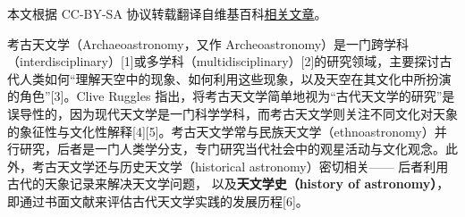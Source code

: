 
本文根据 CC-BY-SA 协议转载翻译自维基百科\href{https://en.wikipedia.org/wiki/Archaeoastronomy}{相关文章}。


考古天文学（Archaeoastronomy，又作 Archeoastronomy）是一门跨学科（interdisciplinary）[1]或多学科（multidisciplinary）[2]的研究领域，主要探讨古代人类如何“理解天空中的现象、如何利用这些现象，以及天空在其文化中所扮演的角色”[3]。Clive Ruggles 指出，将考古天文学简单地视为“古代天文学的研究”是误导性的，因为现代天文学是一门科学学科，而考古天文学则关注不同文化对天象的象征性与文化性解释[4][5]。考古天文学常与民族天文学（ethnoastronomy）并行研究，后者是一门人类学分支，专门研究当代社会中的观星活动与文化观念。此外，考古天文学还与历史天文学（historical astronomy）密切相关—— 后者利用古代的天象记录来解决天文学问题，  
以及\textbf{天文学史（history of astronomy）}，  
即通过书面文献来评估古代天文学实践的发展历程[6]。
